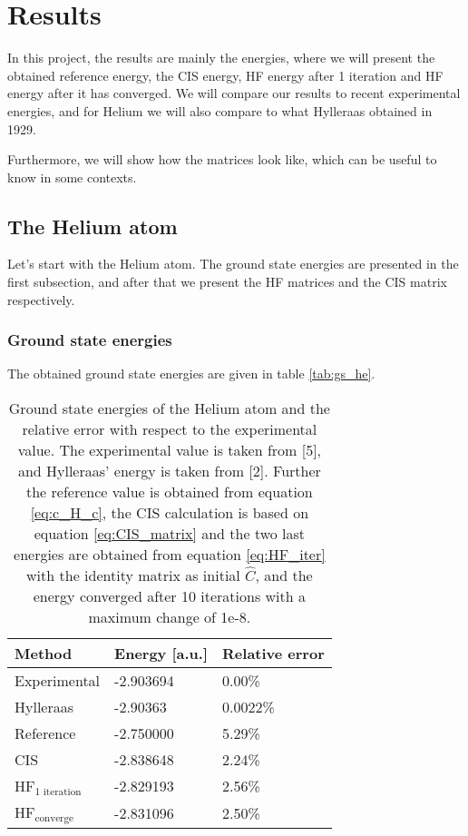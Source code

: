 \section{Results} \label{sec:results}
In this project, the results are mainly the energies, where we will present the obtained reference energy, the CIS energy, HF energy after 1 iteration and HF energy after it has converged. We will compare our results to recent experimental energies, and for Helium we will also compare to what Hylleraas obtained in 1929. 

Furthermore, we will show how the matrices look like, which can be useful to know in some contexts. 

\subsection{The Helium atom}
Let's start with the Helium atom. The ground state energies are presented in the first subsection, and after that we present the HF matrices and the CIS matrix respectively. 

\subsubsection{Ground state energies}
The obtained ground state energies are given in table \eqref{tab:gs_he}.
\begin{table} [H]
	\caption{Ground state energies of the Helium atom and the relative error with respect to the experimental value. The experimental value is taken from [5], and Hylleraas' energy is taken from [2]. Further the reference value is obtained from equation \eqref{eq:c_H_c}, the CIS calculation is based on equation \eqref{eq:CIS_matrix} and the two last energies are obtained from equation \eqref{eq:HF_iter} with the identity matrix as initial $\hat{C}$, and the energy converged after 10 iterations with a maximum change of 1e-8.}
	\begin{tabularx}{\textwidth}{X|X|X} \hline\hline
		\textbf{Method}&\textbf{Energy} [a.u.]&\textbf{Relative error}\\ \hline
		Experimental & -2.903694 & 0.00\%  \\
		Hylleraas & -2.90363 & 0.0022\% \\
		Reference & -2.750000 & 5.29\% \\
		CIS & -2.838648 &  2.24\% \\
		HF$_{\text{1 iteration}}$ & -2.829193 & 2.56\% \\
		HF$_{\text{converge}}$ & -2.831096 & 2.50\% \\ \hline\hline
	\end{tabularx}
	\label{tab:gs_he}
\end{table}

